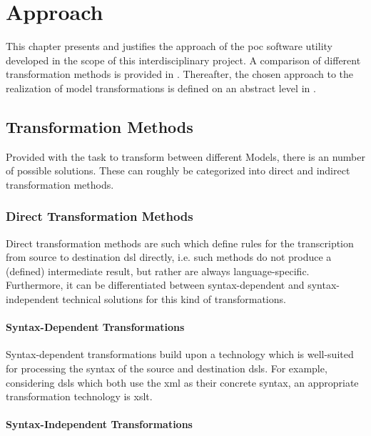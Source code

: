 \chapter{Approach}
\label{chap:approach}

This chapter presents and justifies the approach of the \gls{poc} software utility developed in the scope of this interdisciplinary project. A comparison of different transformation methods is provided in . Thereafter, the chosen approach to the realization of model transformations is defined on an abstract level in .

\section{Transformation Methods}
\label{sec:approach:transform}

Provided with the task to transform between different Models, there is an number of possible solutions. These can roughly be categorized into direct and indirect transformation methods.

\subsection{Direct Transformation Methods}

Direct transformation methods are such which define rules for the transcription from source to destination \gls{dsl} directly, i.e. such methods do not produce a (defined) intermediate result, but rather are always language-specific. Furthermore, it can be differentiated between syntax-dependent and syntax-independent technical solutions for this kind of transformations.

\subsubsection{Syntax-Dependent Transformations}

Syntax-dependent transformations build upon a technology which is well-suited for processing the syntax of the source and destination \glspl{dsl}. For example, considering \glspl{dsl} which both use the \gls{xml}\cite{ref:xml} as their concrete syntax, an appropriate transformation technology is \gls{xslt}\cite{ref:xslt}.

\subsubsection{Syntax-Independent Transformations}

